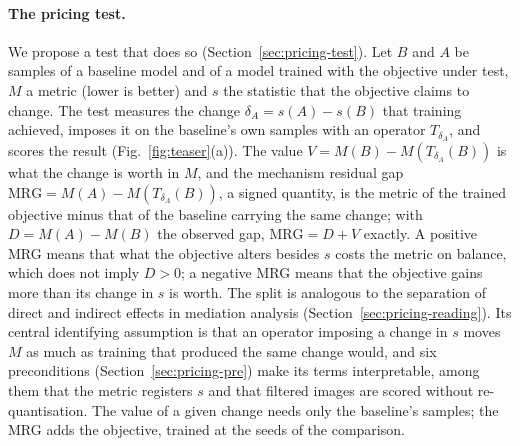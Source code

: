 \paragraph{The pricing test.}
We propose a test that does so (Section~\ref{sec:pricing-test}). Let $B$
and $A$ be samples of a baseline model and of a model trained with the
objective under test, $M$ a metric (lower is better) and $s$ the statistic
that the objective claims to change. The test measures the change
$\delta_A = s(A) - s(B)$ that training achieved, imposes it on the baseline's
own samples with an operator $T_{\delta_A}$, and scores the result
(Fig.~\ref{fig:teaser}(a)). The value $V = M(B) - M(T_{\delta_A}(B))$ is
what the change is worth in $M$, and the mechanism residual gap
$\mathrm{MRG} = M(A) - M(T_{\delta_A}(B))$, a signed quantity, is the
metric of the trained objective minus that of the baseline carrying the same
change; with $D = M(A) - M(B)$ the observed gap, $\mathrm{MRG} = D + V$
exactly. A positive MRG means that what the objective alters besides $s$
costs the metric on balance, which does not imply $D > 0$; a negative MRG
means that the objective gains more than its change in $s$ is worth. The
split is analogous to the separation of direct and indirect effects in
mediation analysis \citep{robins1992identifiability,pearl2001direct}
(Section~\ref{sec:pricing-reading}). Its central identifying assumption is
that an operator imposing a change in $s$ moves $M$ as much as training that
produced the same change would, and six preconditions
(Section~\ref{sec:pricing-pre}) make its terms interpretable, among them that
the metric registers $s$ and that filtered images are scored without
re-quantisation. The value of a given change needs only the baseline's
samples; the MRG adds the objective, trained at the seeds of the comparison.


